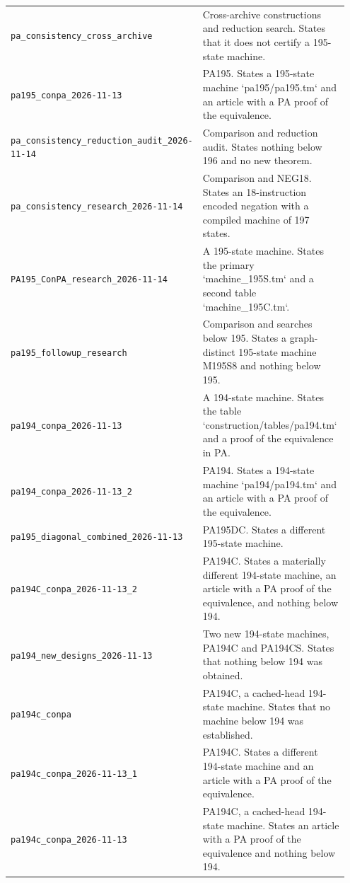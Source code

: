 \begin{longtable}{@{}p{0.36\linewidth}p{0.59\linewidth}@{}}
\nolinkurl{pa_consistency_cross_archive} & Cross-archive constructions and reduction search. States that it does not certify a 195-state machine.\\[4pt]
\nolinkurl{pa195_conpa_2026-11-13} & PA195. States a 195-state machine `pa195/pa195.tm` and an article with a PA proof of the equivalence.\\[4pt]
\nolinkurl{pa_consistency_reduction_audit_2026-11-14} & Comparison and reduction audit. States nothing below 196 and no new theorem.\\[4pt]
\nolinkurl{pa_consistency_research_2026-11-14} & Comparison and NEG18. States an 18-instruction encoded negation with a compiled machine of 197 states.\\[4pt]
\nolinkurl{PA195_ConPA_research_2026-11-14} & A 195-state machine. States the primary `machine\_195S.tm` and a second table `machine\_195C.tm`.\\[4pt]
\nolinkurl{pa195_followup_research} & Comparison and searches below 195. States a graph-distinct 195-state machine M195S8 and nothing below 195.\\[4pt]
\nolinkurl{pa194_conpa_2026-11-13} & A 194-state machine. States the table `construction/tables/pa194.tm` and a proof of the equivalence in PA.\\[4pt]
\nolinkurl{pa194_conpa_2026-11-13_2} & PA194. States a 194-state machine `pa194/pa194.tm` and an article with a PA proof of the equivalence.\\[4pt]
\nolinkurl{pa195_diagonal_combined_2026-11-13} & PA195DC. States a different 195-state machine.\\[4pt]
\nolinkurl{pa194C_conpa_2026-11-13_2} & PA194C. States a materially different 194-state machine, an article with a PA proof of the equivalence, and nothing below 194.\\[4pt]
\nolinkurl{pa194_new_designs_2026-11-13} & Two new 194-state machines, PA194C and PA194CS. States that nothing below 194 was obtained.\\[4pt]
\nolinkurl{pa194c_conpa} & PA194C, a cached-head 194-state machine. States that no machine below 194 was established.\\[4pt]
\nolinkurl{pa194c_conpa_2026-11-13_1} & PA194C. States a different 194-state machine and an article with a PA proof of the equivalence.\\[4pt]
\nolinkurl{pa194c_conpa_2026-11-13} & PA194C, a cached-head 194-state machine. States an article with a PA proof of the equivalence and nothing below 194.\\[4pt]

\end{longtable}

